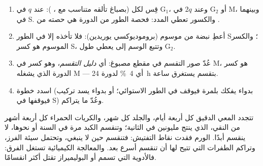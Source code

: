\begin{method}\label{met:b1:replication-mitosis:reading}
\begin{enumerate}
  \item قِس  لكل  (بصباغ تألقه متناسب مع ،  ):
         عند $q$ في G$_1$، وعند $2q$ في G$_2$ أو M، وبينهما في
        S. والكسور تعطي المدد: فحصة الطور من الدورة هي حصته من
        .
  \item أعطِ نبضة من  موسوم (بروموديوكسي يوريدين): فلا
        تأخذه إلا  في الطور S؛ والكسر الموسوم هو كسر S، وتتبع
        الوسم إلى  يعطي طول G$_2$.
  \item عُدّ صور التقسم في مقطع مصبوغ: أي \emph{دليل التقسم}، وهو كسر
         في M، هو كسر الدورة الذي يشغله M --- أي \qty{4}{\%}
        لدورة \qty{24}{h} بتقسم يستغرق ساعة.
  \item اسدد خطوة (بدواء يفكك بلمرة  فيوقف 
        في الطور الاستوائي؛ أو بدواء يسد تركيب  فيوقفها في S) وعُدّ
        ما يتراكم.
\end{enumerate}
\end{method}

\begin{example}[التجدد]\label{ex:b1:replication-mitosis:turnover}
تتجدد  المعي الدقيق كل أربعة أيام، والجلد كل شهر، والكريات
الحمراء كل أربعة أشهر من النقي، الذي ينتج مليونين في الثانية؛ وتنقسم
 الكبد مرة في السنة أو نحوها،  لا ينقسم أبدًا. 
الورم فقدت نقاط التفتيش: فتنقسم حين لا ينبغي، وتحتمل  سيئة
الفرز، وتراكم الطفرات التي تتيح لها أن تنقسم أسرع بعد. والمعالجة
الكيميائية تستغل الفرق: فالأدوية التي تسمم  أو البوليميراز تقتل
أكثر  انقسامًا.
\end{example}

